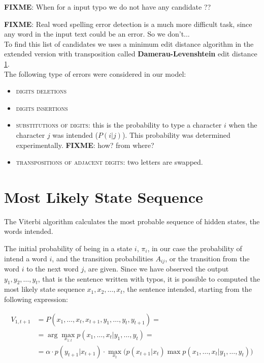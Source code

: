 \textbf{FIXME}: When for a input typo we do not have any candidate ?? 

\textbf{FIXME}: Real word spelling error detection is a much more difficult task, since any word in the input text 
could be 
an error. So we don’t...\\


To find this list of candidates we uses a minimum edit distance algorithm in the extended version with 
transposition called \textbf{Damerau-Levenshtein} edit distance \ref{}.	\\

The following type of errors were considered in our model:
\begin{itemize}
	\item \textsc{digits deletions}
	\item \textsc{digits insertions}
	\item \textsc{substitutions of digits}: this is the probability to type a character $i$ when the character $j$ was 
	intended ($P(i|j)$). This probability was determined experimentally. \textbf{FIXME}: how? from where?
	\item \textsc{transpositions of adjacent digits}: two letters are swapped.
\end{itemize}

\section{Most Likely State Sequence}

The Viterbi algorithm calculates the most probable sequence of hidden states, the words intended.

The initial probability of being in a state $i$, $\pi_i$, in our case the probability of intend a word $i$, and the 
transition probabilities $A_{ij}$, or the transition from the word $i$ to the next word $j$, are given. Since we have 
observed the output $y_1, y_2, \dots , y_t$, that is the sentence written with typos, it is possible to computed the most 
likely state sequence $x_1, x_2, \dots , x_t$, the sentence intended, starting from the following expression:

\begin{equation}
	\begin{aligned}
		V_{1,t+1} &= P(x_1, \dots, x_t, x_{t+1}, y_1, \dots, y_t,  y_{t+1}) = \\
						&= \arg\max_{x_{1:t}} p(x_1, \dots, x_t | y_1, \dots, y_t) = \\
						& =  \alpha \cdot p(y_{t+1}|x_{t+1})\cdot\max_{x_t} \Big( p(x_{t+1}|x_t) \max p(x_1, \dots, x_{t}|y_1, 
						\dots, y_t)\Big)
	\end{aligned}
\end{equation}

